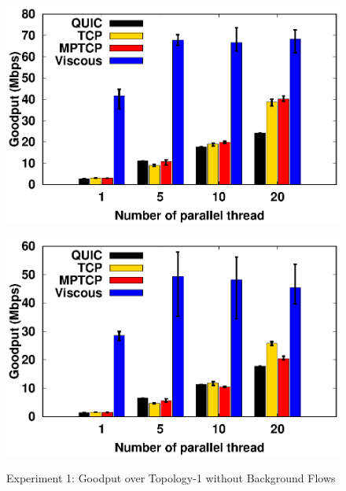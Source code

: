 \begin{figure}[!t]
\begin{center}
\begin{minipage}{0.45\linewidth}
            \includegraphics[width=\linewidth]{img/exp6/goodput_10}
            \label{fig:exp6_goodput_160}
        \end{minipage}
        \begin{minipage}{0.45\linewidth}
            \centering
            \includegraphics[width=\linewidth]{img/exp6/goodput_20}
            \label{fig:exp6_goodput_320}
        \end{minipage}
        \caption{\label{fig:exp6_goodput}Experiment 1: Goodput over Topology-1 without Background Flows}
    \end{center}
\end{figure}

